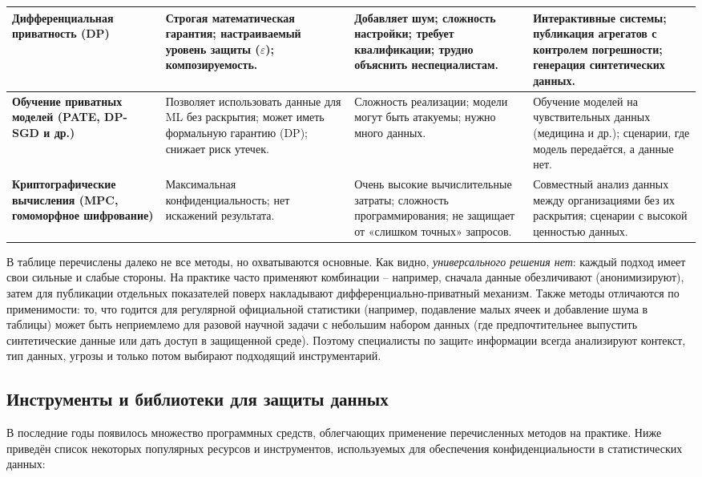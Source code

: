 \begin{table}[h!]
{\begin{tabular}{|p{3.4cm}|p{4.8cm}|p{4.8cm}|p{3.8cm}|}
    \textbf{Дифференциальная приватность (DP)} &
    Строгая математическая гарантия; настраиваемый уровень защиты ($\varepsilon$); композируемость. &
    Добавляет шум; сложность настройки; требует квалификации; трудно объяснить неспециалистам. &
    Интерактивные системы; публикация агрегатов с контролем погрешности; генерация синтетических данных. \\ \hline
    
    \textbf{Обучение приватных моделей (PATE, DP-SGD и др.)} &
    Позволяет использовать данные для ML без раскрытия; может иметь формальную гарантию (DP); снижает риск утечек. &
    Сложность реализации; модели могут быть атакуемы; нужно много данных. &
    Обучение моделей на чувствительных данных (медицина и др.); сценарии, где модель передаётся, а данные нет. \\ \hline
    
    \textbf{Криптографические вычисления (MPC, гомоморфное шифрование)} &
    Максимальная конфиденциальность; нет искажений результата. &
    Очень высокие вычислительные затраты; сложность программирования; не защищает от «слишком точных» запросов. &
    Совместный анализ данных между организациями без их раскрытия; сценарии с высокой ценностью данных. \\ \hline
    
    \end{tabular}%
    }
    \end{table}    
     В таблице перечислены далеко не все методы, но охватываются основные. Как видно, \textit{универсального решения нет}: каждый подход имеет свои сильные и слабые стороны. На практике часто применяют комбинации – например, сначала данные обезличивают (анонимизируют), затем для публикации отдельных показателей поверх накладывают дифференциально-приватный механизм. Также методы отличаются по применимости: то, что годится для регулярной официальной статистики (например, подавление малых ячеек и добавление шума в таблицы) может быть неприемлемо для разовой научной задачи с небольшим набором данных (где предпочтительнее выпустить синтетические данные или дать доступ в защищенной среде). Поэтому специалисты по защитe информации всегда анализируют контекст, тип данных, угрозы и только потом выбирают подходящий инструментарий. \subsection{Инструменты и библиотеки для защиты данных}
В последние годы появилось множество программных средств, облегчающих применение перечисленных методов на практике. Ниже приведён список некоторых популярных ресурсов и инструментов, используемых для обеспечения конфиденциальности в статистических данных:
